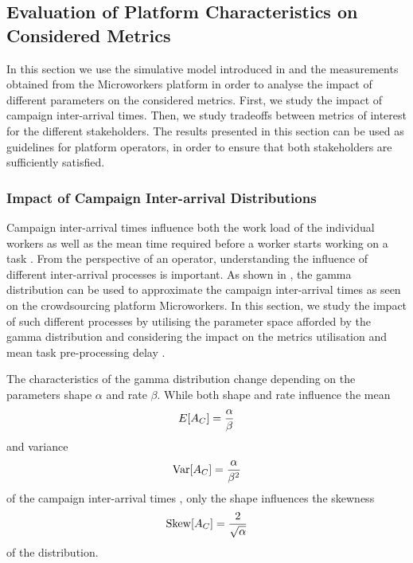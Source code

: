 \subsection{Evaluation of Platform Characteristics on Considered Metrics}\label{sec:cloud:crowdsourcing:performance_evaluation}

In this section we use the simulative model introduced in  and the measurements obtained from the Microworkers platform in order to analyse the impact of different parameters on the considered metrics.
First, we study the impact of campaign inter-arrival times.
Then, we study tradeoffs between metrics of interest for the different stakeholders.
The results presented in this section can be used as guidelines for platform operators, in order to ensure that both stakeholders are sufficiently satisfied.

\subsubsection*{Impact of Campaign Inter-arrival Distributions}

Campaign inter-arrival times \campaignIAT influence both the work load of the individual workers \workerUtilization as well as the mean time required before a worker starts working on a task \preTaskProcessingDelay.
From the perspective of an operator, understanding the influence of different inter-arrival processes is important.
As shown in , the gamma distribution can be used to approximate the campaign inter-arrival times \campaignIAT as seen on the crowdsourcing platform Microworkers.
In this section, we study the impact of such different processes by utilising the parameter space afforded by the gamma distribution and considering the impact on the metrics utilisation \workerUtilization and mean task pre-processing delay \preTaskProcessingDelay.

The characteristics of the gamma distribution change depending on the parameters shape \(\alpha\) and rate \(\beta\).
While both shape and rate influence the mean
\begin{equation*}
E[A_C] =  \frac{\alpha}{\beta}
\end{equation*}
and variance
\begin{equation*}
\operatorname{Var}[A_C] =  \frac{\alpha}{\beta^2}
\end{equation*}
of the campaign inter-arrival times \campaignIAT, only the shape influences the skewness
\begin{equation*}
\operatorname{Skew}[A_C] =  \frac{2}{\sqrt{\alpha}}
\end{equation*}
of the distribution.

